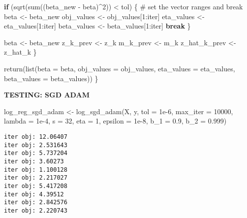 \documentclass[
  letterpaper,
  DIV=11,
  numbers=noendperiod]{scrartcl}
\newenvironment{Shaded}{\begin{snugshade}}{\end{snugshade}}
\newcommand{\AttributeTok}[1]{\textcolor[rgb]{0.40,0.45,0.13}{#1}}
\newcommand{\CommentTok}[1]{\textcolor[rgb]{0.37,0.37,0.37}{#1}}
\newcommand{\ControlFlowTok}[1]{\textcolor[rgb]{0.00,0.23,0.31}{\textbf{#1}}}
\newcommand{\DecValTok}[1]{\textcolor[rgb]{0.68,0.00,0.00}{#1}}
\newcommand{\FloatTok}[1]{\textcolor[rgb]{0.68,0.00,0.00}{#1}}
\newcommand{\FunctionTok}[1]{\textcolor[rgb]{0.28,0.35,0.67}{#1}}
\newcommand{\NormalTok}[1]{\textcolor[rgb]{0.00,0.23,0.31}{#1}}
\newcommand{\OtherTok}[1]{\textcolor[rgb]{0.00,0.23,0.31}{#1}}
\newcommand{\SpecialCharTok}[1]{\textcolor[rgb]{0.37,0.37,0.37}{#1}}
\begin{document}
\begin{Shaded}
\begin{Highlighting}[]
    \ControlFlowTok{if}\NormalTok{ (}\FunctionTok{sqrt}\NormalTok{(}\FunctionTok{sum}\NormalTok{((beta\_new }\SpecialCharTok{{-}}\NormalTok{ beta)}\SpecialCharTok{\^{}}\DecValTok{2}\NormalTok{)) }\SpecialCharTok{\textless{}}\NormalTok{ tol) \{}
      \CommentTok{\# set the vector ranges and break}
\NormalTok{      beta }\OtherTok{\textless{}{-}}\NormalTok{ beta\_new}
\NormalTok{      obj\_values }\OtherTok{\textless{}{-}}\NormalTok{ obj\_values[}\DecValTok{1}\SpecialCharTok{:}\NormalTok{iter]}
\NormalTok{      eta\_values }\OtherTok{\textless{}{-}}\NormalTok{ eta\_values[}\DecValTok{1}\SpecialCharTok{:}\NormalTok{iter]}
\NormalTok{      beta\_values }\OtherTok{\textless{}{-}}\NormalTok{ beta\_values[}\DecValTok{1}\SpecialCharTok{:}\NormalTok{iter]}
      \ControlFlowTok{break}
\NormalTok{    \}}
    
\NormalTok{    beta }\OtherTok{\textless{}{-}}\NormalTok{ beta\_new}
\NormalTok{    z\_k\_prev }\OtherTok{\textless{}{-}}\NormalTok{ z\_k}
\NormalTok{    m\_k\_prev }\OtherTok{\textless{}{-}}\NormalTok{ m\_k}
\NormalTok{    z\_hat\_k\_prev }\OtherTok{\textless{}{-}}\NormalTok{ z\_hat\_k}
\NormalTok{  \}}
  
  \FunctionTok{return}\NormalTok{(}\FunctionTok{list}\NormalTok{(}\AttributeTok{beta =}\NormalTok{ beta, }\AttributeTok{obj\_values =}\NormalTok{ obj\_values, }\AttributeTok{eta\_values =}\NormalTok{ eta\_values, }\AttributeTok{beta\_values =}\NormalTok{ beta\_values))}
\NormalTok{\}}
\end{Highlighting}
\end{Shaded}

\textbf{TESTING: SGD ADAM}

\begin{Shaded}
\begin{Highlighting}[]
\NormalTok{log\_reg\_sgd\_adam }\OtherTok{\textless{}{-}} \FunctionTok{log\_sgd\_adam}\NormalTok{(X, y, }\AttributeTok{tol =} \FloatTok{1e{-}6}\NormalTok{, }\AttributeTok{max\_iter =} \DecValTok{10000}\NormalTok{, }\AttributeTok{lambda =} \FloatTok{1e{-}4}\NormalTok{, }\AttributeTok{s =} \DecValTok{32}\NormalTok{, }\AttributeTok{eta =} \DecValTok{1}\NormalTok{, }\AttributeTok{epsilon =} \FloatTok{1e{-}8}\NormalTok{, }\AttributeTok{b\_1 =} \FloatTok{0.9}\NormalTok{, }\AttributeTok{b\_2 =} \FloatTok{0.999}\NormalTok{)}
\end{Highlighting}
\end{Shaded}

\begin{verbatim}
iter obj: 12.06407 
iter obj: 2.531643 
iter obj: 5.737204 
iter obj: 3.60273 
iter obj: 1.100128 
iter obj: 2.217027 
iter obj: 5.417208 
iter obj: 4.39512 
iter obj: 2.842576 
iter obj: 2.220743 
\end{verbatim}
\end{document}
